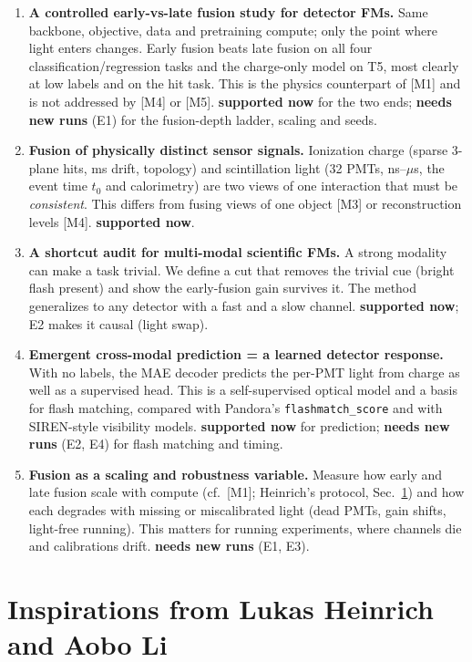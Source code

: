 \documentclass[11pt,a4paper]{article}
\newcommand{\code}[1]{\texttt{\small #1}}
\newcommand{\have}{{\color{green!45!black}\textbf{supported now}}}
\newcommand{\need}{{\color{orange!80!black}\textbf{needs new runs}}}
\begin{document}
\begin{enumerate}[label=\textbf{I\arabic*.}]
  \item \textbf{A controlled early-vs-late fusion study for detector FMs.} Same backbone, objective, data and pretraining compute; only the point where light enters changes. Early fusion beats late fusion on all four classification/regression tasks and the charge-only model on T5, most clearly at low labels and on the hit task. This is the physics counterpart of [M1] and is not addressed by [M4] or [M5]. \have{} for the two ends; \need{} (E1) for the fusion-depth ladder, scaling and seeds.
  \item \textbf{Fusion of physically distinct sensor signals.} Ionization charge (sparse 3-plane hits, ms drift, topology) and scintillation light (32 PMTs, ns--$\mu$s, the event time $t_0$ and calorimetry) are two views of one interaction that must be \emph{consistent}. This differs from fusing views of one object [M3] or reconstruction levels [M4]. \have.
  \item \textbf{A shortcut audit for multi-modal scientific FMs.} A strong modality can make a task trivial. We define a cut that removes the trivial cue (bright flash present) and show the early-fusion gain survives it. The method generalizes to any detector with a fast and a slow channel. \have; E2 makes it causal (light swap).
  \item \textbf{Emergent cross-modal prediction = a learned detector response.} With no labels, the MAE decoder predicts the per-PMT light from charge as well as a supervised head. This is a self-supervised optical model and a basis for flash matching, compared with Pandora's \code{flashmatch\_score} and with SIREN-style visibility models. \have{} for prediction; \need{} (E2, E4) for flash matching and timing.
  \item \textbf{Fusion as a scaling and robustness variable.} Measure how early and late fusion scale with compute (cf.\ [M1]; Heinrich's protocol, Sec.~\ref{sec:insp}) and how each degrades with missing or miscalibrated light (dead PMTs, gain shifts, light-free running). This matters for running experiments, where channels die and calibrations drift. \need{} (E1, E3).
\end{enumerate}

\section{Inspirations from Lukas Heinrich and Aobo Li}\label{sec:insp}
\end{document}
